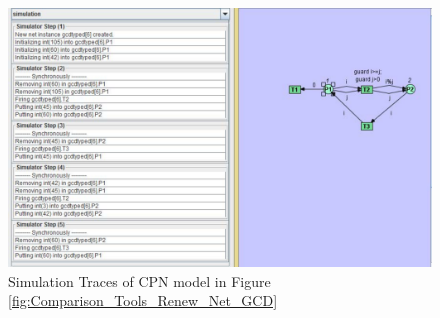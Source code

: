 \begin{figure}[!htbp]
	\centering
	\includegraphics[scale = 0.7]{Comparison_Tools_Renew_Sim_GCD.pdf}
	\caption{Simulation Traces of CPN model in Figure \ref{fig:Comparison_Tools_Renew_Net_GCD}}
	\label{fig:Comparison_Tools_Renew_Sim_GCD}
\end{figure}

